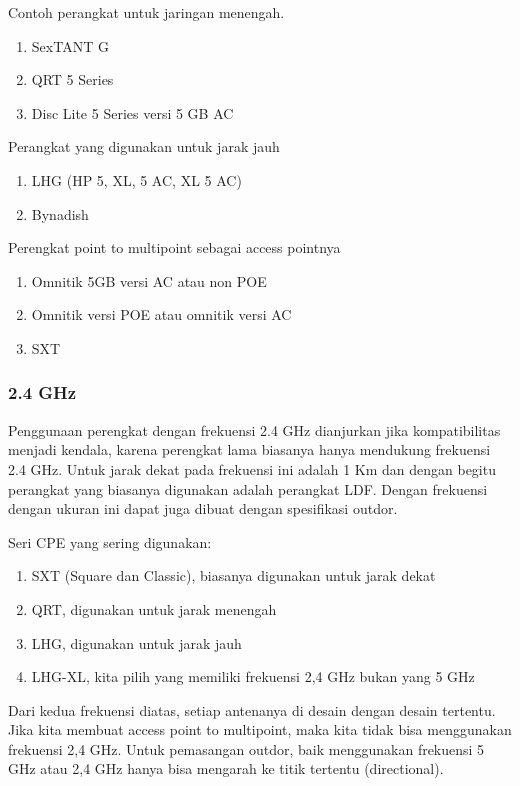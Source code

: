 \documentclass[a4paper,12pt]{article}
\begin{document}
Contoh perangkat untuk jaringan menengah.
\begin{enumerate}
    \item SexTANT G
    \item QRT 5 Series
    \item Disc Lite 5 Series versi 5 GB AC
\end{enumerate}

Perangkat yang digunakan untuk jarak jauh
\begin{enumerate}
    \item LHG (HP 5, XL, 5 AC, XL 5 AC)
    \item Bynadish
\end{enumerate}

Perengkat point to multipoint sebagai access pointnya
\begin{enumerate}
   \item Omnitik 5GB versi AC atau non POE
   \item Omnitik versi POE atau omnitik versi AC
   \item SXT
\end{enumerate}

\subsubsection{2.4 GHz}
Penggunaan perengkat dengan frekuensi 2.4 GHz dianjurkan jika kompatibilitas menjadi kendala, karena perengkat lama
biasanya hanya mendukung frekuensi 2.4 GHz. Untuk jarak dekat pada frekuensi ini adalah 1 Km dan
dengan begitu perangkat yang biasanya digunakan adalah
perangkat LDF. Dengan frekuensi dengan ukuran ini dapat juga
dibuat dengan spesifikasi outdor.

Seri CPE yang sering digunakan:
\begin{enumerate}
    \item SXT (Square dan Classic), biasanya digunakan untuk jarak dekat
    \item QRT, digunakan untuk jarak menengah
    \item LHG, digunakan untuk jarak jauh
    \item LHG-XL, kita pilih yang memiliki frekuensi 2,4 GHz bukan yang 5 GHz
\end{enumerate}

Dari kedua frekuensi diatas, setiap antenanya di desain dengan
desain tertentu. Jika kita membuat access point to multipoint, maka
kita tidak bisa menggunakan frekuensi 2,4 GHz. Untuk pemasangan
outdor, baik menggunakan frekuensi 5 GHz atau 2,4 GHz hanya bisa
mengarah ke titik tertentu (directional).
\end{document}
